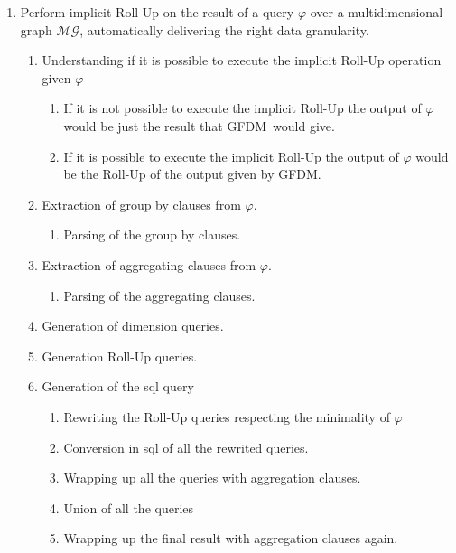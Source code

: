 \documentclass[12pt,a4paper]{report}
\newcommand\systemName{GFDM}
\newcommand\globalQuery{\varphi}
\newcommand\multidimensionalGraph{\mathcal{MG}}
\begin{document}
\begin{enumerate}
    \item Perform implicit Roll-Up on the result of a query $\globalQuery$ over a multidimensional graph $\multidimensionalGraph$, automatically delivering the right data granularity.
    \begin{enumerate}
        \item Understanding if it is possible to execute the implicit Roll-Up operation given $\globalQuery$
        \begin{enumerate}
            \item If it is not possible to execute the implicit Roll-Up the output of $\globalQuery$\, would be just the result that \systemName\, would give.
            \item If it is possible to execute the implicit Roll-Up the output of $\globalQuery$ would be the Roll-Up of the output given by \systemName.
        \end{enumerate}
        \item Extraction of group by clauses from $\globalQuery$.
        \begin{enumerate}
            \item Parsing of the group by clauses.
        \end{enumerate}
        \item Extraction of aggregating clauses from $\globalQuery$.
        \begin{enumerate}
            \item Parsing of the aggregating clauses.
        \end{enumerate}
        \item Generation of dimension queries.
        \item Generation Roll-Up queries.
        \item Generation of the sql query
        \begin{enumerate}
            \item Rewriting the Roll-Up queries respecting the minimality of $\globalQuery$
            \item Conversion in sql of all the rewrited queries.
            \item Wrapping up all the queries with aggregation clauses.
            \item Union of all the queries
          \item Wrapping up the final result with aggregation clauses again.
        \end{enumerate}

\end{enumerate}
\end{enumerate}
\end{document}
